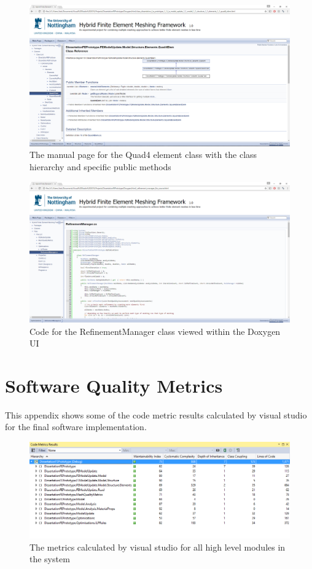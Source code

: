\begin{figure}[H]
  \centerline{\includegraphics[width=150mm,  scale=0.5]{../Graphics/Doxygen/Quad4Element.png}}
  \caption{The manual page for the Quad4 element class with the class hierarchy and specific public methods}
\end{figure}

\begin{figure}[H]
  \centerline{\includegraphics[width=150mm,  scale=0.5]{../Graphics/Doxygen/RefinementManager.png}}
  \caption{Code for the RefinementManager class viewed within the Doxygen UI}
\end{figure}


\newpage
\section{Software Quality Metrics}
This appendix shows some of the code metric results calculated by visual studio for the final software implementation.
\begin{figure}[H]
  \centerline{\includegraphics[width=165mm, scale=0.5]{../Graphics/softwareQualityMetrics.png}}
  \caption{The metrics calculated by visual studio for all high level modules in the system}
\end{figure}

